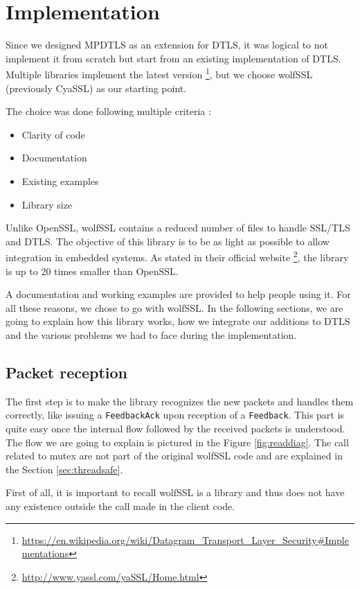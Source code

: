 \chapter{Implementation}\label{chap:implementation}

Since we designed MPDTLS as an extension for DTLS, it was logical to not implement it from scratch but start from an existing implementation of DTLS. Multiple libraries implement the latest version \footnote{\url{https://en.wikipedia.org/wiki/Datagram_Transport_Layer_Security\#Implementations}}, but we choose wolfSSL \cite{wolfssl} (previously CyaSSL) as our starting point.

The choice was done following multiple criteria :

\begin{itemize}
\item Clarity of code
\item Documentation
\item Existing examples
\item Library size
\end{itemize}

Unlike OpenSSL, wolfSSL contains a reduced number of files to handle SSL/TLS and DTLS. The objective of this library is to be as light as possible to allow integration in embedded systems. As stated in their official website \footnote{\url{http://www.yassl.com/yaSSL/Home.html}}, the library is up to 20 times smaller than OpenSSL.

A documentation and working examples are provided to help people using it. For all these reasons, we chose to go with wolfSSL. In the following sections, we are going to explain how this library works, how we integrate our additions to DTLS and the various problems we had to face during the implementation.

\section{Packet reception}
The first step is to make the library recognizes the new packets and handles them correctly, like issuing a \texttt{FeedbackAck} upon reception of a \texttt{Feedback}. This part is quite easy once the internal flow followed by the received packets is understood. The flow we are going to explain is pictured in the Figure \ref{fig:readdiag}. The call related to mutex are not part of the original wolfSSL code and are explained in the Section \ref{sec:threadsafe}.

First of all, it is important to recall wolfSSL is a library and thus does not have any existence outside the call made in the client code.


